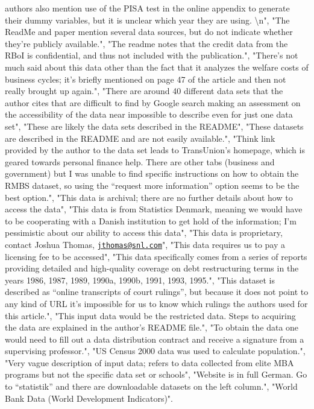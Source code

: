 \documentclass[]{article}
\begin{document}
\begin{itemize}
  authors also mention use of the PISA test in the online appendix to
  generate their dummy variables, but it is unclear which year they are
  using. \textbackslash{}n", "The ReadMe and paper mention several data
  sources, but do not indicate whether they're publicly available.",
  "The readme notes that the credit data from the RBoI is confidential,
  and thus not included with the publication.", "There's not much said
  about this data other than the fact that it analyzes the welfare costs
  of business cycles; it's briefly mentioned on page 47 of the article
  and then not really brought up again.", "There are around 40 different
  data sets that the author cites that are difficult to find by Google
  search making an assessment on the accessibility of the data near
  impossible to describe even for just one data set", "These are likely
  the data sets described in the README", "These datasets are described
  in the README and are not easily available.", "Think link provided by
  the author to the data set leads to TransUnion's homepage, which is
  geared towards personal finance help. There are other tabs (business
  and government) but I was unable to find specific instructions on how
  to obtain the RMBS dataset, so using the ``request more information''
  option seems to be the best option.", "This data is archival; there
  are no further details about how to access the data", "This data is
  from Statistics Denmark, meaning we would have to be cooperating with
  a Danish institution to get hold of the information; I'm pessimistic
  about our ability to access this data", "This data is proprietary,
  contact Joshua Thomas,
  \href{mailto:jthomas@snl.com}{\nolinkurl{jthomas@snl.com}}", "This
  data requires us to pay a licensing fee to be accessed", "This data
  specifically comes from a series of reports providing detailed and
  high-quality coverage on debt restructuring terms in the years 1986,
  1987, 1989, 1990a, 1990b, 1991, 1993, 1995.", "This dataset is
  described as ``online transcripts of court rulings'', but because it
  does not point to any kind of URL it's impossible for us to know which
  rulings the authors used for this article.", "This input data would be
  the restricted data. Steps to acquiring the data are explained in the
  author's README file.", "To obtain the data one would need to fill out
  a data distribution contract and receive a signature from a
  supervising professor.", "US Census 2000 data was used to calculate
  population.", "Very vague description of input data; refers to data
  collected from elite MBA programs but not the specific data set or
  schools", "Website is in full German. Go to ``statistik'' and there
  are downloadable datasets on the left column.", "World Bank Data
  (World Development Indicators)".
\end{itemize}
\end{document}
